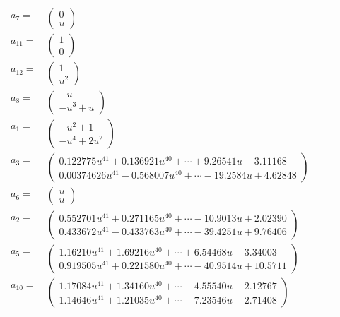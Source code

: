 \documentclass[1p]{elsarticle_modified}
\theoremstyle{definition}
\begin{document}
\begin{tabular}{m{7pt} m{180pt} m{7pt} m{180pt} }
\flushright $a_{7}=$&$\begin{pmatrix}0\\u\end{pmatrix}$ \\
\flushright $a_{11}=$&$\begin{pmatrix}1\\0\end{pmatrix}$ \\
\flushright $a_{12}=$&$\begin{pmatrix}1\\u^2\end{pmatrix}$ \\
\flushright $a_{8}=$&$\begin{pmatrix}- u\\- u^3+u\end{pmatrix}$ \\
\flushright $a_{1}=$&$\begin{pmatrix}- u^2+1\\- u^4+2 u^2\end{pmatrix}$ \\
\flushright $a_{3}=$&$\begin{pmatrix}0.122775 u^{41}+0.136921 u^{40}+\cdots+9.26541 u-3.11168\\0.00374626 u^{41}-0.568007 u^{40}+\cdots-19.2584 u+4.62848\end{pmatrix}$ \\
\flushright $a_{6}=$&$\begin{pmatrix}u\\u\end{pmatrix}$ \\
\flushright $a_{2}=$&$\begin{pmatrix}0.552701 u^{41}+0.271165 u^{40}+\cdots-10.9013 u+2.02390\\0.433672 u^{41}-0.433763 u^{40}+\cdots-39.4251 u+9.76406\end{pmatrix}$ \\
\flushright $a_{5}=$&$\begin{pmatrix}1.16210 u^{41}+1.69216 u^{40}+\cdots+6.54468 u-3.34003\\0.919505 u^{41}+0.221580 u^{40}+\cdots-40.9514 u+10.5711\end{pmatrix}$ \\
\flushright $a_{10}=$&$\begin{pmatrix}1.17084 u^{41}+1.34160 u^{40}+\cdots-4.55540 u-2.12767\\1.14646 u^{41}+1.21035 u^{40}+\cdots-7.23546 u-2.71408\end{pmatrix}$ \\

\end{tabular}
\end{document}
